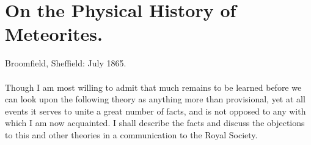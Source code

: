 \documentclass[a4paper, 12pt, oneside]{article}
\begin{document}
\section{On the Physical History of Meteorites.}
\begin{center}
Broomfield, Sheffield: July 1865.
\end{center}
\paragraph{}
Though I am most willing to admit that much remains to be learned before we can look upon the following theory as anything more than provisional, yet at all events it serves to unite a great number of facts, and is not opposed to any with which I am now acquainted. I shall describe the facts and discuss the objections to this and other theories in a communication to the Royal Society.
\end{document}
